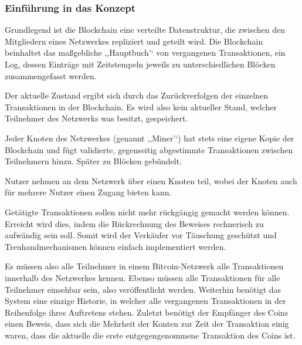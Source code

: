     \subsubsection{Einführung in das Konzept}
    \label{sec:sota_blockchain_introduction}
    
    Grundlegend ist die Blockchain eine verteilte Datenstruktur, die zwischen den Mitgliedern eines Netzwerkes repliziert und geteilt wird\cite{Christidis2016}.
    Die Blockchain beinhaltet das maßgebliche ,,Hauptbuch'` von vergangenen Transaktionen, ein Log, dessen Einträge mit Zeitstempeln jeweils zu unterschiedlichen Blöcken zusammengefasst werden. 
    
    Der aktuelle Zustand ergibt sich durch das Zurückverfolgen der einzelnen Transaktionen in der Blockchain. 
    Es wird also kein aktueller Stand, welcher Teilnehmer des Netzwerks was besitzt, gespeichert. 
    
    Jeder Knoten des Netzwerkes (genannt ,,Miner'`) hat stets eine eigene Kopie der Blockchain und fügt validierte, gegenseitig abgestimmte Transaktionen zwischen Teilnehmern hinzu.
    Später zu Blöcken gebündelt.
    
    Nutzer nehmen an dem Netzwerk über einen Knoten teil, wobei der Knoten auch für mehrere Nutzer einen Zugang bieten kann. 
    
    Getätigte Transaktionen sollen nicht mehr rückgängig gemacht werden können.
    Erreicht wird dies, indem die Rückrechnung des Beweises rechnerisch zu aufwändig sein soll\cite{Nakamoto2008}.
    Somit wird der Verkäufer vor Täuschung geschützt und Treuhandmechanismen können einfach implementiert werden\cite{Nakamoto2008}.  
    
    Es müssen also alle Teilnehmer in einem Bitcoin-Netzwerk alle Transaktionen innerhalb des Netzwerkes kennen.
    Ebenso müssen alle Transaktionen für alle Teilnehmer einsehbar sein, also veröffentlicht werden.
    Weiterhin benötigt das System eine einzige Historie, in welcher alle vergangenen Transaktionen in der Reihenfolge ihres Auftretens stehen.
    Zuletzt benötigt der Empfänger des Coins einen Beweis, dass sich die Mehrheit der Konten zur Zeit der Transaktion einig waren, dass die aktuelle die erste entgegengenommene Transaktion des Coins ist. 
    \cite{Nakamoto2008}
    
